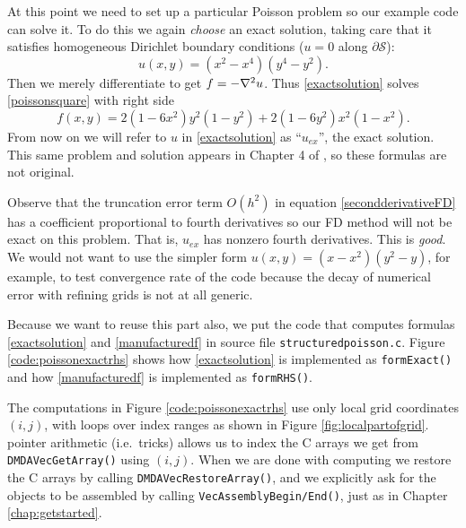 At this point we need to set up a particular Poisson problem so our example code can solve it.  To do this we again \emph{choose} an exact solution, taking care that it satisfies homogeneous Dirichlet boundary conditions ($u=0$ along $\partial \mathcal{S}$):
\begin{equation}
u(x,y) = (x^2 - x^4) (y^4 - y^2). \label{exactsolution}
\end{equation}
Then we merely differentiate to get $f = -\nabla^2 u$.  Thus \eqref{exactsolution} solves \eqref{poissonsquare} with right side
\begin{equation}
f(x,y) = 2 (1 - 6 x^2) y^2 (1 - y^2) + 2 (1 - 6 y^2) x^2 (1 - x^2).\label{manufacturedf}
\end{equation}
From now on we will refer to $u$ in \eqref{exactsolution} as ``$u_{ex}$'', the exact solution.  This same problem and solution appears in Chapter 4 of \citep{Briggsetal2000}, so these formulas are not original. %

Observe that the truncation error term $O(h^2)$ in equation \eqref{secondderivativeFD} has a coefficient proportional to fourth derivatives \citep{MortonMayers} so our FD method will not be exact on this problem.  That is, $u_{ex}$ has nonzero fourth derivatives.  This is \emph{good}.  We would not want to use the simpler form $u(x,y)=(x-x^2)(y^2-y)$, for example, to test convergence rate of the code because the decay of numerical error with refining grids is not at all generic.

Because we want to reuse this part also, we put the code that computes formulas \eqref{exactsolution} and \eqref{manufacturedf} in source file \texttt{structuredpoisson.c}.  Figure \ref{code:poissonexactrhs} shows how \eqref{exactsolution} is implemented as \texttt{formExact()} and how \eqref{manufacturedf} is implemented as \texttt{formRHS()}.


The computations in Figure \ref{code:poissonexactrhs} use only local grid coordinates $(i,j)$, with loops over index ranges as shown in Figure \ref{fig:localpartofgrid}.  \PETSc pointer arithmetic (i.e.~tricks) allows us to index the C arrays we get from \texttt{DMDAVecGetArray()} using $(i,j)$.  When we are done with computing \pVecs we restore the C arrays by calling \texttt{DMDAVecRestoreArray()}, and we explicitly ask for the \pVec objects to be assembled by calling \texttt{VecAssemblyBegin/End()}, just as in Chapter \ref{chap:getstarted}.

